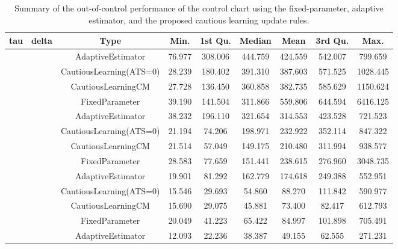 \begin{table}[!h]

\caption{Summary of the out-of-control performance of the control chart using the fixed-parameter, adaptive estimator, and the proposed cautious learning update rules.}
\centering
\begin{tabular}[t]{ccccccccc}
\toprule
tau & delta & Type & Min. & 1st Qu. & Median & Mean & 3rd Qu. & Max.\\
\midrule
 &  & AdaptiveEstimator & 76.977 & 308.006 & 444.759 & 424.559 & 542.007 & 799.659\\

 &  & CautiousLearning(ATS=0) & 28.239 & 180.402 & 391.310 & 387.603 & 571.525 & 1028.445\\

 &  & CautiousLearningCM & 27.728 & 136.450 & 360.858 & 382.735 & 585.629 & 1150.624\\

 & \multirow[t]{-4}{*}{\centering\arraybackslash 0.25} & FixedParameter & 39.190 & 141.504 & 311.866 & 559.806 & 644.594 & 6416.125\\
\cmidrule{2-9}
 &  & AdaptiveEstimator & 38.232 & 196.110 & 321.654 & 314.553 & 423.528 & 721.523\\

 &  & CautiousLearning(ATS=0) & 21.194 & 74.206 & 198.971 & 232.922 & 352.114 & 847.322\\

 &  & CautiousLearningCM & 21.514 & 57.049 & 149.175 & 210.480 & 311.994 & 938.577\\

 & \multirow[t]{-4}{*}{\centering\arraybackslash 0.35} & FixedParameter & 28.583 & 77.659 & 151.441 & 238.615 & 276.960 & 3048.735\\
\cmidrule{2-9}
 &  & AdaptiveEstimator & 19.901 & 81.292 & 162.779 & 174.618 & 249.388 & 552.951\\

 &  & CautiousLearning(ATS=0) & 15.546 & 29.693 & 54.860 & 88.270 & 111.842 & 590.977\\

 &  & CautiousLearningCM & 15.690 & 29.075 & 45.881 & 73.400 & 82.417 & 612.793\\

 & \multirow[t]{-4}{*}{\centering\arraybackslash 0.50} & FixedParameter & 20.049 & 41.223 & 65.422 & 84.997 & 101.898 & 705.491\\
\cmidrule{2-9}
 &  & AdaptiveEstimator & 12.093 & 22.236 & 38.387 & 49.155 & 62.555 & 271.231\\


\end{tabular}
\end{table}
